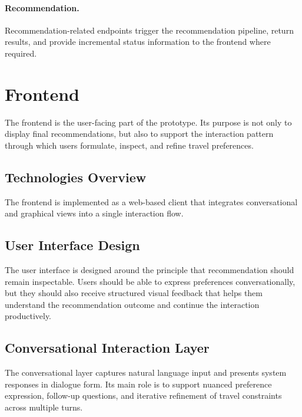 \paragraph{Recommendation.}
Recommendation-related endpoints trigger the recommendation pipeline, return results, and provide incremental status information to the frontend where required.

\section{Frontend}\label{section:system-architecture:frontend}
The frontend is the user-facing part of the prototype. Its purpose is not only to display final recommendations, but also to support the interaction pattern through which users formulate, inspect, and refine travel preferences.

\subsection{Technologies Overview}\label{subsection:system-architecture:frontend-technologies}
The frontend is implemented as a web-based client that integrates conversational and graphical views into a single interaction flow.


\subsection{User Interface Design}\label{subsection:system-architecture:ui-design}
The user interface is designed around the principle that recommendation should remain inspectable. Users should be able to express preferences conversationally, but they should also receive structured visual feedback that helps them understand the recommendation outcome and continue the interaction productively.

\subsection{Conversational Interaction Layer}\label{subsection:system-architecture:conversational-layer}
The conversational layer captures natural language input and presents system responses in dialogue form. Its main role is to support nuanced preference expression, follow-up questions, and iterative refinement of travel constraints across multiple turns.


